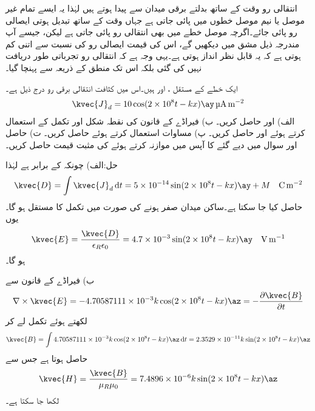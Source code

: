انتقالی رو وقت کے ساتھ بدلتے برقی میدان سے پیدا ہوتے ہیں لہٰذا یہ ایسے تمام غیر موصل یا نیم موصل خطوں میں پائی جاتی ہے جہاں وقت کے ساتھ تبدیل ہوتی ایصالی رو پائی جائے۔اگرچہ موصل خطے میں بھی انتقالی رو پائی جاتی ہے لیکن، جیسے آپ مندرجہ ذیل مشق میں دیکھیں گے، اس کی قیمت ایصالی رو کی نسبت سے اتنی کم ہوتی ہے کہ یہ قابل نظر انداز ہوتی ہے۔یہی وجہ ہے کہ انتقالی رو تجرباتی طور دریافت نہیں کی گئی بلکہ اس تک منطق کے ذریعہ سے پہنچا گیا۔

ایک خطے کے مستقل ،  اور  ہیں۔اس میں کثافت انتقالی برقی رو درج ذیل ہے۔
\begin{align*}
\kvec{J}_d=10\cos(2\times 10^8 t - k x) \ay \, \si{\micro\ampere\per\meter\squared}
\end{align*}
الف)  اور  حاصل کریں۔ ب) فیراڈے کے قانون کی نقطہ شکل اور تکمل کے استعمال کرتے ہوئے  اور  حاصل کریں۔ پ) مساوات  استعمال کرتے ہوئے  حاصل کریں۔ ت) حاصل  اور سوال میں دیے  گئے  کا آپس میں موازنہ کرتے ہوئے  کی مثبت قیمت حاصل کریں۔

حل:الف)  چونکہ  کے برابر ہے لہٰذا
\begin{align*}
\kvec{D}=\int \kvec{J}_d \dif t=5\times 10^{-14} \sin (2\times 10^8 t - k x) \ay +M \quad \si{\coulomb \per\meter\squared}
\end{align*}
حاصل کیا جا سکتا ہے۔ساکن میدان صفر ہونے کی صورت میں تکمل کا مستقل  ہو گا۔یوں
\begin{align*}
\kvec{E}=\frac{\kvec{D}}{\epsilon_R \epsilon_0}=4.7\times 10^{-3} \sin (2\times 10^8 t - k x) \ay \quad \si{\volt\per\meter}
\end{align*}
ہو گا۔

ب) فیراڈے کے قانون سے
\begin{align*}
\nabla \times \kvec{E}=-4.70587111\times 10^{-3} k \cos (2\times 10^8 t - k x) \az=-\frac{\partial \kvec{B}}{\partial t}
\end{align*}
لکھتے ہوئے تکمل لے کر
\begin{align*}
\kvec{B}=\int 4.70587111\times 10^{-3} k \cos (2\times 10^8 t - k x) \az \dif t=2.3529\times 10^{-11} k \sin(2\times 10^8 t - k x) \az
\end{align*}
حاصل ہوتا ہے جس سے
\begin{align*}
\kvec{H}=\frac{\kvec{B}}{\mu_R \mu_0}=7.4896\times 10^{-6} k \sin(2\times 10^8 t - k x) \az
\end{align*}
لکھا جا سکتا ہے۔

